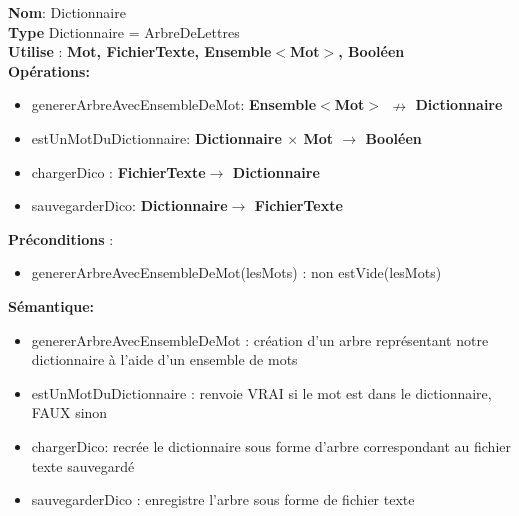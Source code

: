 
    \textbf{Nom}: Dictionnaire\\
    \textbf{Type} Dictionnaire = ArbreDeLettres \\
    \textbf{Utilise} : \textbf{Mot, FichierTexte, Ensemble$<$Mot$>$, Booléen}\\
    \textbf{Opérations:} \begin{itemize}[label=$\ $, leftmargin=2cm, itemsep=0cm]
        \item genererArbreAvecEnsembleDeMot: \textbf{Ensemble$<$Mot$>$ $\nrightarrow $ Dictionnaire}
        \item estUnMotDuDictionnaire: \textbf{Dictionnaire $\times$ Mot $\rightarrow $ Booléen}
        \item chargerDico : \textbf{FichierTexte$ \rightarrow$ Dictionnaire}
        \item sauvegarderDico: \textbf{Dictionnaire$\rightarrow$ FichierTexte}
        
    \end{itemize}
    \textbf{Préconditions} :
    \begin{itemize}[label=$\ $, leftmargin=2cm, itemsep=0cm]
     	\item genererArbreAvecEnsembleDeMot(lesMots) : non estVide(lesMots)
    \end{itemize}

    \textbf{Sémantique: }\begin{itemize}[label=$\- $, leftmargin=2cm, itemsep=0cm]
        \item genererArbreAvecEnsembleDeMot : création d'un arbre représentant notre dictionnaire à l'aide d'un ensemble de mots
        \item estUnMotDuDictionnaire : renvoie VRAI si le mot est dans le dictionnaire, FAUX sinon
        \item chargerDico: recrée le dictionnaire sous forme d'arbre correspondant au fichier texte sauvegardé
        \item sauvegarderDico : enregistre l'arbre sous forme de fichier texte
    \end{itemize}

